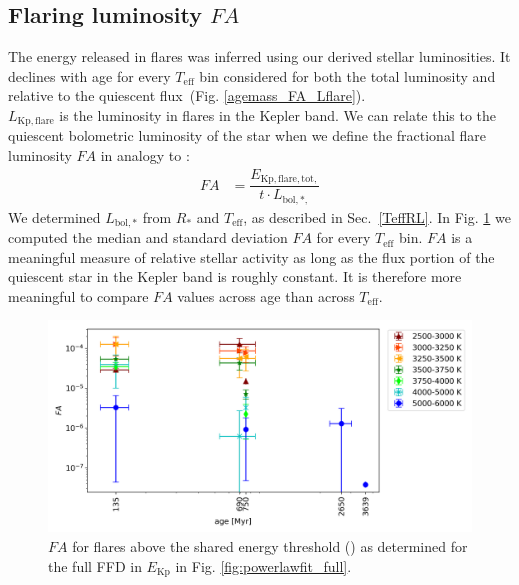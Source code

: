 \documentclass{aa}
\begin{document}
\subsection{Flaring luminosity $FA$}
The energy released in flares was inferred using our derived stellar luminosities. It declines with age for every $T_\mathrm{eff}$ bin considered for both the total luminosity and relative to the quiescent flux~(Fig. \ref{agemass_FA_Lflare}).
\\
$L_\mathrm{Kp,flare}$ is the luminosity in flares in the Kepler band. We can relate this to the quiescent bolometric luminosity of the star when we define the fractional flare luminosity $FA$ in analogy to :
\begin{align}
\label{FA}
FA&=\dfrac{E_\mathrm{Kp,flare,tot,}}{t\cdot L_{\mathrm{bol,*,}}}
\end{align}
We determined $L_\mathrm{bol,*}$ from $R_*$ and $T_\mathrm{eff}$, as described in Sec.~\ref{TeffRL}. In Fig. \ref{fig:FA} we computed the median and standard deviation $FA$ for every $T_\mathrm{eff}$ bin. $FA$ is a meaningful measure of relative stellar activity as long as the flux portion of the quiescent star in the Kepler band is roughly constant. It is therefore more meaningful to compare $FA$ values across age than across $T_\mathrm{eff}$.

\begin{figure}
    \centering
    \includegraphics[width=13.5cm]{pics/FA/FA_T_age_Ethresh.png}
    \caption{$FA$ for flares above the shared energy threshold () as determined for the full FFD in $E_\mathrm{Kp}$ in Fig. \ref{fig:powerlawfit_full}.}          
    \label{fig:FA}
\end{figure}
\end{document}
